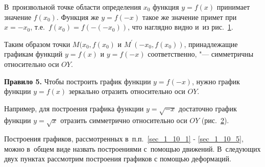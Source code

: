 
В~произвольной точке области определения $x_{0}$ функция
$y = f(x)$ принимает значение $f(x_{0})$.
Функция же $y = f(-x)$ такое же значение примет при $x = -x_{0}$,
т.е.\ $f(x_{0}) = f(-(-x_{0}))$, что наглядно видно и~из рис.\ \ref{fig_1_10_27}.

\begin{figure}\label{fig_1_10_27}
\end{figure}

Таким образом точки $M(x_{0}, f(x_{0})$ и $M^{\prime}(-x_{0}, f(x_{0}))$,
принадлежащие графикам функций $y = f(x)$ и $y = f(-x)$ соответственно,
"--- симметричны относительно оси $OY$.

\textbf{Правило 5.} Чтобы построить график функции $y = f(-x)$,
нужно график функции $y = f(x)$ зеркально отразить относительно оси $OY$.

\begin{figure}
\end{figure}

Например, для построения графика функции $y = \sqrt{-x}$ достаточно
график функции $y = \sqrt{x}$ отразить симметрично относительно оси $OY$
(рис.\ \ref{fig_1_10_28}).

\begin{figure}\label{fig_1_10_28}
\end{figure}

\begin{Note}
Построения графиков, рассмотренных в~п.п.~\ref{sec_1_10_1} - \ref{sec_1_10_5},
можно в~общем виде назвать построениями с~помощью движений.
В~следующих двух пунктах рассмотрим построения графиков с помощью
деформаций.
\end{Note}

